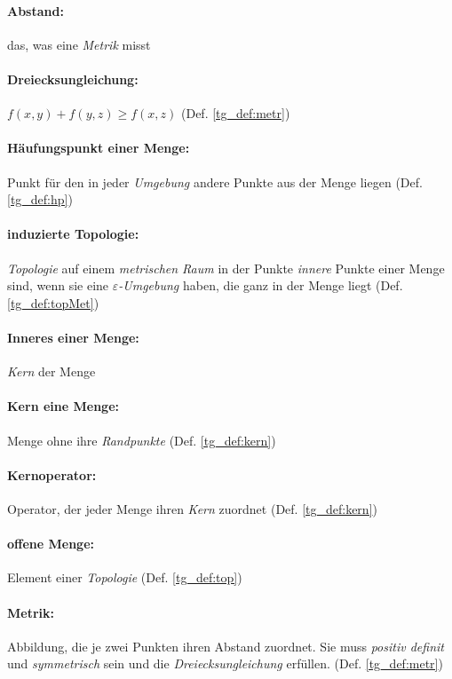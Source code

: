     \paragraph{Abstand:} das, was eine \textit{Metrik} misst
    
    \paragraph{Dreiecksungleichung:} $f(x,y) + f(y,z) \geq f(x,z)$ (Def. \ref{tg_def:metr})

    \paragraph{Häufungspunkt einer Menge:} Punkt für den in jeder \textit{Umgebung} andere Punkte aus der Menge liegen (Def. \ref{tg_def:hp})
    
    \paragraph{induzierte Topologie:} \textit{Topologie} auf einem \textit{metrischen Raum} in der Punkte \textit{innere} Punkte einer Menge sind, wenn sie eine \textit{$\varepsilon$-Umgebung} haben, die ganz in der Menge liegt (Def. \ref{tg_def:topMet})

    \paragraph{Inneres einer Menge:} \textit{Kern} der Menge

    \paragraph{Kern eine Menge:} Menge ohne ihre \textit{Randpunkte} (Def. \ref{tg_def:kern})

    \paragraph{Kernoperator:} Operator, der jeder Menge ihren \textit{Kern} zuordnet (Def. \ref{tg_def:kern})

    \paragraph{offene Menge:} Element einer \textit{Topologie} (Def. \ref{tg_def:top})
    
    \paragraph{Metrik:} Abbildung, die je zwei Punkten ihren Abstand zuordnet. Sie muss \textit{positiv definit} und \textit{symmetrisch} sein und die \textit{Dreiecksungleichung} erfüllen. (Def. \ref{tg_def:metr})
    
